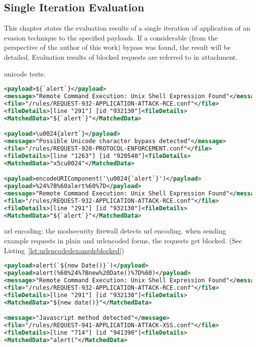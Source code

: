 \subsection{Single Iteration Evaluation}
This chapter states the evaluation results of a single iteration of application of an evasion technique to the specified payloads. If a considerable (from the perspective of the author of this work) bypass was found, the result will be detailed. Evaluation results of blocked requests are referred to in attachment.


unicode tests:
\begin{lstlisting}[style=ruleStyle, language=XML, caption=unicode tests \$\{`alert`\}, label={lst:unicodetests}]
<payload>${`alert`}</payload>
<message>"Remote Command Execution: Unix Shell Expression Found"</message>
<file>"/rules/REQUEST-932-APPLICATION-ATTACK-RCE.conf"</file>
<fileDetails>[line "291"] [id "932130"]<fileDetails>
<MatchedData>"${`alert`}"</MatchedData>

<payload>\u0024{alert`}</payload>
<message>"Possible Unicode character bypass detected"</message>
<file>"/rules/REQUEST-920-PROTOCOL-ENFORCEMENT.conf"</file>
<fileDetails>[line "1263"] [id "920540"]<fileDetails>
<MatchedData>"x5cu0024"</MatchedData>

<payload>encodeURIComponent('\u0024{`alert`}')</payload>
<payload>%24%7B%60alert%60%7D</payload>
<message>"Remote Command Execution: Unix Shell Expression Found"</message>
<file>"/rules/REQUEST-932-APPLICATION-ATTACK-RCE.conf"</file>
<fileDetails>[line "291"] [id "932130"]<fileDetails>
<MatchedData>"${`alert`}"</MatchedData>
\end{lstlisting}


url encoding: the modsecurity firewall detects url encoding. when sending example requests in plain and urlencoded forms, the requests get blocked. (See Listing~\ref{lst:urlencodedexampleblocked})

\begin{lstlisting}[style=ruleStyle, language=XML, caption=url encoded example blocked, label={lst:urlencodedexampleblocked}]
<payload>alert(`${new Date()}`)</payload>
<payload>alert(%60%24%7Bnew%20Date()%7D%60)</payload>
<message>"Remote Command Execution: Unix Shell Expression Found"</message>
<file>"/rules/REQUEST-932-APPLICATION-ATTACK-RCE.conf"</file>
<fileDetails>[line "291"] [id "932130"]<fileDetails>
<MatchedData>"${new date()}"</MatchedData>

<message>"Javascript method detected"</message>
<file>"/rules/REQUEST-941-APPLICATION-ATTACK-XSS.conf"</file>
<fileDetails>[line "714"] [id "941390"]<fileDetails>
<MatchedData>"alert("</MatchedData>
\end{lstlisting}


